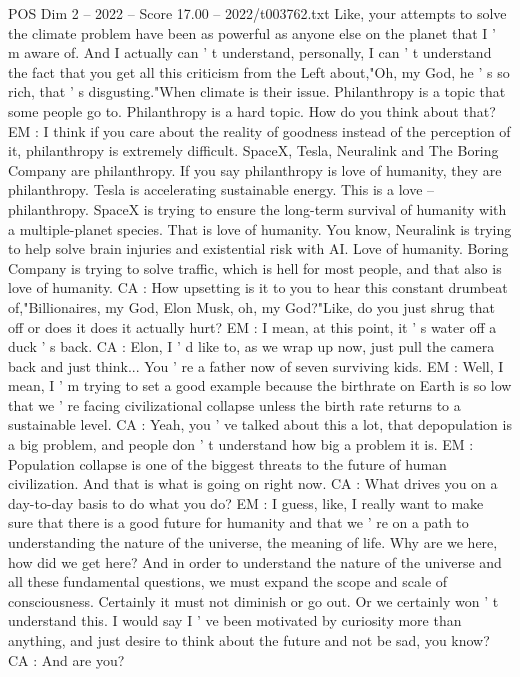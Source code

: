 \begin{textsample}{POS Dim 2 – 2022 – Score 17.00 – 2022/t003762.txt}
Like, your attempts to solve the climate problem have been as powerful as anyone else on the planet that I ' m aware of.
And I actually can ' t understand, personally, I can ' t understand the fact that you get all this criticism from the Left about,"Oh, my God, he ' s so rich, that ' s disgusting."When climate is their issue.
Philanthropy is a topic that some people go to.
Philanthropy is a hard topic.
How do you think about that?
EM : I think if you care about the reality of goodness instead of the perception of it, philanthropy is extremely difficult.
SpaceX, Tesla, Neuralink and The Boring Company are philanthropy.
If you say philanthropy is love of humanity, they are philanthropy.
Tesla is accelerating sustainable energy.
This is a love -- philanthropy.
SpaceX is trying to ensure the long-term survival of humanity with a multiple-planet species.
That is love of humanity.
You know, Neuralink is trying to help solve brain injuries and existential risk with AI.
Love of humanity.
Boring Company is trying to solve traffic, which is hell for most people, and that also is love of humanity.
CA : How upsetting is it to you to hear this constant drumbeat of,"Billionaires, my God, Elon Musk, oh, my God?"Like, do you just shrug that off or does it does it actually hurt?
EM : I mean, at this point, it ' s water off a duck ' s back.
CA : Elon, I ' d like to, as we wrap up now, just pull the camera back and just think...
You ' re a father now of seven surviving kids.
EM : Well, I mean, I ' m trying to set a good example because the birthrate on Earth is so low that we ' re facing civilizational collapse unless the birth rate returns to a sustainable level.
CA : Yeah, you ' ve talked about this a lot, that depopulation is a big problem, and people don ' t understand how big a problem it is.
EM : Population collapse is one of the biggest threats to the future of human civilization.
And that is what is going on right now.
CA : What drives you on a day-to-day basis to do what you do?
EM : I guess, like, I really want to make sure that there is a good future for humanity and that we ' re on a path to understanding the nature of the universe, the meaning of life.
Why are we here, how did we get here?
And in order to understand the nature of the universe and all these fundamental questions, we must expand the scope and scale of consciousness.
Certainly it must not diminish or go out.
Or we certainly won ' t understand this.
I would say I ' ve been motivated by curiosity more than anything, and just desire to think about the future and not be sad, you know?
CA : And are you?

\end{textsample}
